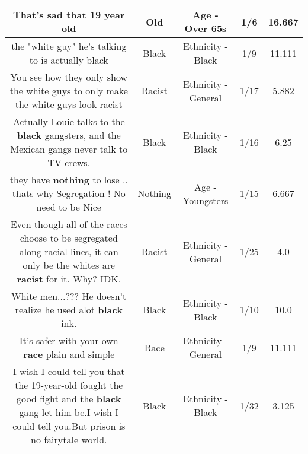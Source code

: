 \documentclass[11pt]{article}
\newlength\mylength
\begin{document}
\begin{center}
\begin{longtable}{|C{.65\mylength}|C{.30\mylength}|C{.12\mylength}|C{.12\mylength}|C{.12\mylength}|}
  \small That's sad that 19 year old\normalsize   & Old & Age - Over 65s & 1/6 & 16.667 \\  \hline
  \small the "white guy" he's talking to is actually black\normalsize   & Black & Ethnicity - Black & 1/9 & 11.111 \\  \hline
  \small You see how they only show the white guys to only make the white guys look racist\normalsize   & Racist & Ethnicity - General & 1/17 & 5.882 \\  \hline
  \small Actually Louie talks to the \textbf{black} gangsters, and the Mexican gangs never talk to TV crews.\normalsize   & Black & Ethnicity - Black & 1/16 & 6.25 \\  \hline
  \small they have \textbf{nothing} to lose .. thats why   Segregation ! No need to be Nice\normalsize   & Nothing & Age - Youngsters & 1/15 & 6.667 \\  \hline
  \small Even though all of the races choose to be segregated along racial lines, it can only be the whites are \textbf{racist} for it. Why? IDK.\normalsize   & Racist & Ethnicity - General & 1/25 & 4.0 \\  \hline
  \small White men...??? He doesn't realize he used  alot \textbf{black} ink.\normalsize   & Black & Ethnicity - Black & 1/10 & 10.0 \\  \hline
  \small It's safer with your own \textbf{race} plain and simple\normalsize   & Race & Ethnicity - General & 1/9 & 11.111 \\  \hline
  \small I wish I could tell you that the 19-year-old fought the good fight and the \textbf{black} gang let him be.I wish I could tell you.But prison is no fairytale world.\normalsize   & Black & Ethnicity - Black & 1/32 & 3.125 \\  \hline

\end{longtable}
\end{center}
\end{document}
